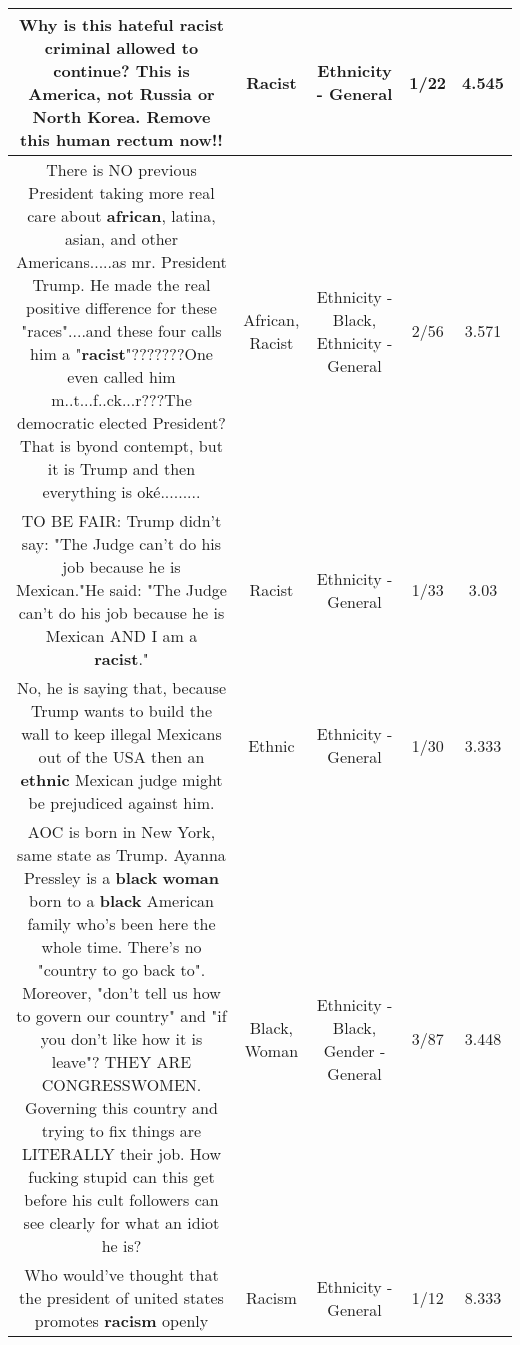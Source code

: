 \documentclass[11pt]{article}
\newlength\mylength
\begin{document}
\begin{center}
\begin{longtable}{|C{.65\mylength}|C{.30\mylength}|C{.12\mylength}|C{.12\mylength}|C{.12\mylength}|}
  \small Why is this hateful \textbf{racist} criminal allowed to continue?  This is America, not Russia or North Korea.  Remove this human rectum now!!\normalsize   & Racist & Ethnicity - General & 1/22 & 4.545 \\  \hline
  \small There is NO previous President taking more real care about \textbf{african}, latina, asian, and other Americans.....as mr. President Trump. He made the real positive difference for these "races"....and these four calls him a "\textbf{racist}"???????One even called him m..t...f..ck...r???The democratic elected President? That is byond contempt, but it is Trump and then everything is oké.........\normalsize   & African, Racist & Ethnicity - Black, Ethnicity - General & 2/56 & 3.571 \\  \hline
  \small TO BE FAIR: Trump didn't say: "The Judge can't do his job because he is Mexican."He said: "The Judge can't do his job because he is Mexican AND I am a \textbf{racist}."\normalsize   & Racist & Ethnicity - General & 1/33 & 3.03 \\  \hline
  \small No, he is saying that, because Trump wants to build the wall to keep illegal Mexicans out of the USA then an \textbf{ethnic} Mexican judge might be prejudiced against him.\normalsize   & Ethnic & Ethnicity - General & 1/30 & 3.333 \\  \hline
  \small AOC is born in New York, same state as Trump.  Ayanna Pressley is a \textbf{black} \textbf{woman} born to a \textbf{black} American family who's been here the whole time.  There's no "country to go back to".   Moreover, "don't tell us how to govern our country" and "if you don't like how it is leave"?   THEY ARE CONGRESSWOMEN.  Governing this country and trying to fix things are LITERALLY their job.  How fucking stupid can this get before his cult followers can see clearly for what an idiot he is?\normalsize   & Black, Woman & Ethnicity - Black, Gender - General & 3/87 & 3.448 \\  \hline
  \small Who would've thought that the president of united states promotes \textbf{racism} openly\normalsize   & Racism & Ethnicity - General & 1/12 & 8.333 \\  \hline

\end{longtable}
\end{center}
\end{document}
